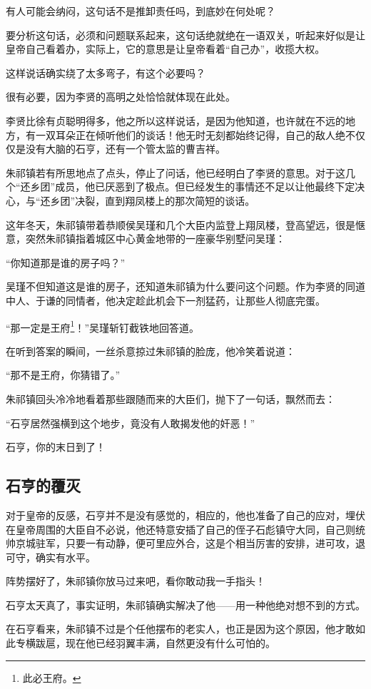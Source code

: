 \begin{multicols}{\theparacolNo}
有人可能会纳闷，这句话不是推卸责任吗，到底妙在何处呢？

要分析这句话，必须和问题联系起来，这句话绝就绝在一语双关，听起来好似是让皇帝自己看着办，实际上，它的意思是让皇帝看着“自己办”，收揽大权。

这样说话确实绕了太多弯子，有这个必要吗？

很有必要，因为李贤的高明之处恰恰就体现在此处。

李贤比徐有贞聪明得多，他之所以这样说话，是因为他知道，也许就在不远的地方，有一双耳朵正在倾听他们的谈话！他无时无刻都始终记得，自己的敌人绝不仅仅是没有大脑的石亨，还有一个管太监的曹吉祥。

朱祁镇若有所思地点了点头，停止了问话，他已经明白了李贤的意思。对于这几个“还乡团”成员，他已厌恶到了极点。但已经发生的事情还不足以让他最终下定决心，与“还乡团”决裂，直到翔凤楼上的那次简短的谈话。

这年冬天，朱祁镇带着恭顺侯吴瑾和几个大臣内监登上翔凤楼，登高望远，很是惬意，突然朱祁镇指着城区中心黄金地带的一座豪华别墅问吴瑾：

“你知道那是谁的房子吗？”

吴瑾不但知道这是谁的房子，还知道朱祁镇为什么要问这个问题。作为李贤的同道中人、于谦的同情者，他决定趁此机会下一剂猛药，让那些人彻底完蛋。

“那一定是王府\footnote{此必王府。}！”吴瑾斩钉截铁地回答道。

在听到答案的瞬间，一丝杀意掠过朱祁镇的脸庞，他冷笑着说道：

“那不是王府，你猜错了。”

朱祁镇回头冷冷地看着那些跟随而来的大臣们，抛下了一句话，飘然而去：

“石亨居然强横到这个地步，竟没有人敢揭发他的奸恶！”

石亨，你的末日到了！

\subsection{石亨的覆灭}
对于皇帝的反感，石亨并不是没有感觉的，相应的，他也准备了自己的应对，埋伏在皇帝周围的大臣自不必说，他还特意安插了自己的侄子石彪镇守大同，自己则统帅京城驻军，只要一有动静，便可里应外合，这是个相当厉害的安排，进可攻，退可守，确实有水平。

阵势摆好了，朱祁镇你放马过来吧，看你敢动我一手指头！

石亨太天真了，事实证明，朱祁镇确实解决了他——用一种他绝对想不到的方式。

在石亨看来，朱祁镇不过是个任他摆布的老实人，也正是因为这个原因，他才敢如此专横跋扈，现在他已经羽翼丰满，自然更没有什么可怕的。


\end{multicols}
